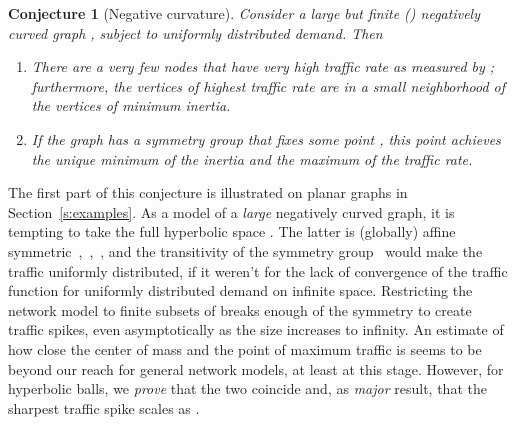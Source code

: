 \documentclass{article}
\newtheorem{conjecture}{Conjecture}
\begin{document}
\begin{conjecture}[Negative curvature]
Consider a large but finite () negatively curved graph , subject to uniformly distributed demand. Then 
\begin{enumerate} 
\item There are a very few nodes  that have very high traffic rate  
as measured by ;  
furthermore, the vertices of highest traffic rate are in a small neighborhood of the vertices of minimum inertia. 
\item If the graph has a symmetry group that fixes some point , 
this point achieves the unique minimum of the inertia and the maximum of the traffic rate. 
\end{enumerate}
\end{conjecture}
\noindent
The first part of this conjecture is illustrated on planar graphs in 
Section~\ref{s:examples}.  
As a model of a {\it large} negatively curved graph, 
it is tempting to take the full hyperbolic space . 
The latter is (globally) affine symmetric~\cite[Chap. IV]{Helgason},~\cite[Sec. 6.2]{Jost1998},~\cite[Chap. XI, Example 10.2]{KobayashiNomizu1996b}, 
and the transitivity of the symmetry group~\cite[XI, Th. 1.4]{KobayashiNomizu1996b}
would make the traffic uniformly distributed,  
if it weren't for the lack of convergence of the traffic function for uniformly distributed demand on infinite space. 
Restricting the network model to finite subsets of  breaks enough of the symmetry 
to create traffic spikes, even asymptotically as the size increases to infinity.  
An estimate of how close the center of mass and the point of maximum traffic is seems to be beyond 
our reach for general network models, at least at this stage. 
However, for hyperbolic balls, we {\it prove} that the two coincide 
and, as {\it major} result, that the sharpest traffic spike scales as . 
\end{document}
